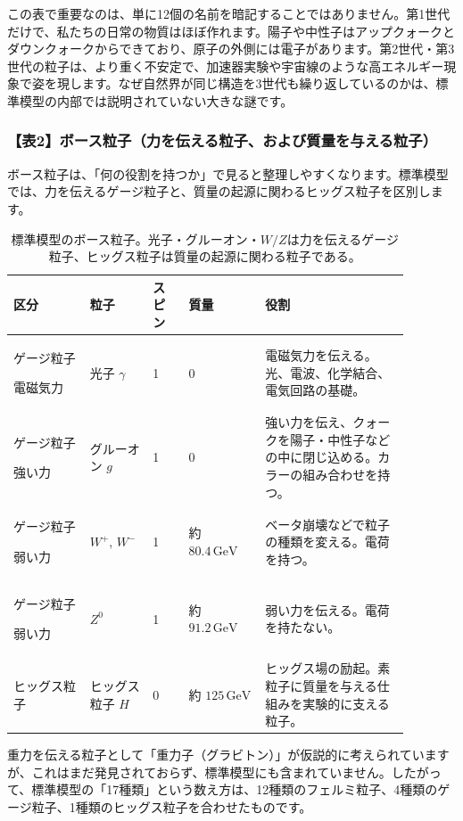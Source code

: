 この表で重要なのは、単に12個の名前を暗記することではありません。第1世代だけで、私たちの日常の物質はほぼ作れます。陽子や中性子はアップクォークとダウンクォークからできており、原子の外側には電子があります。第2世代・第3世代の粒子は、より重く不安定で、加速器実験や宇宙線のような高エネルギー現象で姿を現します。なぜ自然界が同じ構造を3世代も繰り返しているのかは、標準模型の内部では説明されていない大きな謎です。

\subsubsection{【表2】ボース粒子（力を伝える粒子、および質量を与える粒子）}

ボース粒子は、「何の役割を持つか」で見ると整理しやすくなります。標準模型では、力を伝えるゲージ粒子と、質量の起源に関わるヒッグス粒子を区別します。

\begin{table}[htbp]
\centering
\small
\setlength{\tabcolsep}{4pt}
\renewcommand{\arraystretch}{1.25}
\begin{tabular}{p{0.17\linewidth}p{0.14\linewidth}p{0.08\linewidth}p{0.17\linewidth}p{0.32\linewidth}}
\hline
区分 & 粒子 & スピン & 質量 & 役割 \\
\hline
ゲージ粒子\par 電磁気力 & 光子 \(\gamma\) & 1 & 0 & 電磁気力を伝える。光、電波、化学結合、電気回路の基礎。 \\
ゲージ粒子\par 強い力 & グルーオン \(g\) & 1 & 0 & 強い力を伝え、クォークを陽子・中性子などの中に閉じ込める。カラーの組み合わせを持つ。 \\
ゲージ粒子\par 弱い力 & \(W^+\), \(W^-\) & 1 & 約 \(80.4\,\mathrm{GeV}\) & ベータ崩壊などで粒子の種類を変える。電荷を持つ。 \\
ゲージ粒子\par 弱い力 & \(Z^0\) & 1 & 約 \(91.2\,\mathrm{GeV}\) & 弱い力を伝える。電荷を持たない。 \\
ヒッグス粒子 & ヒッグス粒子 \(H\) & 0 & 約 \(125\,\mathrm{GeV}\) & ヒッグス場の励起。素粒子に質量を与える仕組みを実験的に支える粒子。 \\
\hline
\end{tabular}
\caption{標準模型のボース粒子。光子・グルーオン・\(W/Z\)は力を伝えるゲージ粒子、ヒッグス粒子は質量の起源に関わる粒子である。}
\end{table}

重力を伝える粒子として「重力子（グラビトン）」が仮説的に考えられていますが、これはまだ発見されておらず、標準模型にも含まれていません。したがって、標準模型の「17種類」という数え方は、12種類のフェルミ粒子、4種類のゲージ粒子、1種類のヒッグス粒子を合わせたものです。

